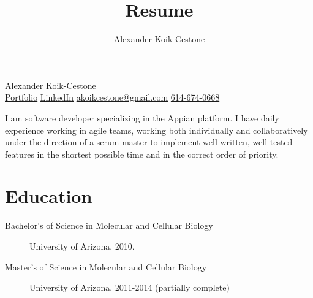 \documentclass{article}
\author{Alexander Koik-Cestone}
\title{Resume}
\begin{document}
\begin{center}
{\huge Alexander Koik-Cestone\vspace{0.3cm}} \\
\href{https://sirkoik.github.io#portfolio}{Portfolio}
\textcolor{gray}{\textbullet}
\href{https://www.linkedin.com/in/alexander-koik-cestone-89304556/}{LinkedIn}
\textcolor{gray}{\textbullet}
\href{mailto:akoikcestone@gmail.com}{akoikcestone@gmail.com}
\textcolor{gray}{\textbullet}
\href{tel:614-674-0668}{614-674-0668} \\
\end{center}

\noindent
I am software developer specializing in the Appian platform. I have daily experience working in agile teams, working both individually and collaboratively under the direction of a scrum master to implement well-written, well-tested features in the shortest possible time and in the correct order of priority.

\section*{Education}\vspace{-0.5em}
\begin{description}
  \item[Bachelor's of Science in Molecular and Cellular Biology] University of Arizona, 2010.
  \item[Master's of Science in Molecular and Cellular Biology] University of Arizona, 2011-2014 (partially complete)
\end{description}

\vspace{-1em}
\end{document}
